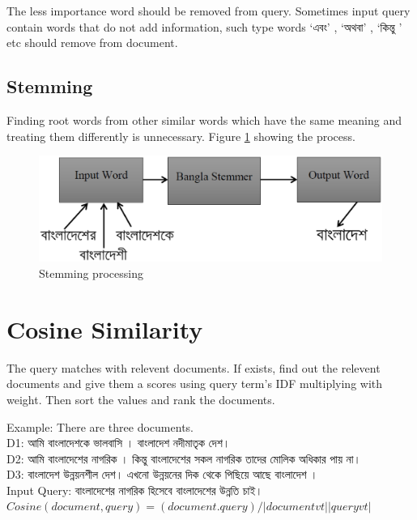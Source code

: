 The less importance word should be removed from query. Sometimes input query contain words that do not add information, such type words {\unicodefont ‘এবং’ , ‘অথবা’ , ‘কিন্তু ’} etc should remove from document.

\subsection{Stemming}

Finding root words from other similar words which have the same meaning and treating them differently is unnecessary. Figure \ref{Figure:stemm} showing the process.

\begin{figure}[htp]
	\centering
		\includegraphics[width=.65\textwidth]{figure/four.eps}
	\caption{Stemming processing}
	\label{Figure:stemm}
\end{figure}


\section{Cosine Similarity}

The query matches with relevent documents. If exists, find out the relevent documents and give them a scores using query term’s IDF multiplying with weight. Then sort the values and rank the documents.

Example:
There are three documents.\\
	D1: {\unicodefont আমি  বাংলাদেশকে ভালবাসি । বাংলাদেশ নদীমাতৃক দেশ।} \\
	D2: {\unicodefont আমি বাংলাদেশের নাগরিক । কিন্তু বাংলাদেশের সকল  নাগরিক তাদের মোলিক অধিকার পায় না। }\\
	D3: {\unicodefont বাংলাদেশ উন্নয়নশীল দেশ। এখনো উন্নয়নের দিক থেকে পিছিয়ে আছে বাংলাদেশ ।  }\\
	
Input Query: {\unicodefont বাংলাদেশের নাগরিক হিসেবে বাংলাদেশের উন্নতি চাই।}\\

\(Cosine(document , query)  = (document . query) / |document vt | |query vt|\)\\


